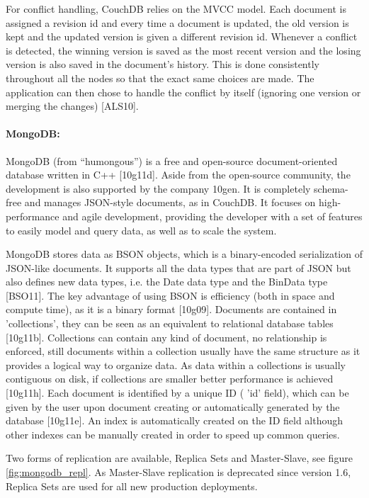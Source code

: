 \pagebreak
\pagebreak
For conflict handling, CouchDB relies on the MVCC model. Each document is assigned a revision id and every time a document is updated, the old version is kept and the updated version is given a different revision id. Whenever a conflict is detected, the winning version is saved as the most recent version and the losing version is also saved in the document’s history. This is done consistently throughout all the nodes so that the exact same choices are made. The application can then chose to handle the conflict by itself (ignoring one version or merging the changes) [ALS10].


\paragraph{MongoDB:\label{sec:back_mongo}}
MongoDB (from “humongous”) is a free and open-source document-oriented database written in C++ [10g11d]. Aside from the open-source community, the development is also supported by the company 10gen.
It is completely schema-free and manages JSON-style documents, as in CouchDB. It focuses on high-performance and agile development, providing the developer with a set of features to easily model and query data, as well as to scale the system.

MongoDB stores data as BSON objects, which is a binary-encoded serialization of JSON-like documents. It supports all the data types that are part of JSON but also defines new data types, i.e. the Date data type and the BinData type [BSO11]. The key advantage of using BSON is efficiency (both in space and compute time), as it is a binary format [10g09].
Documents are contained in 'collections', they can be seen as an equivalent to relational database tables [10g11b]. Collections can contain any kind of document, no relationship is enforced, still documents within a collection usually have the same structure as it provides a logical way to organize data.
As data within a collections is usually contiguous on disk, if collections are smaller better performance is achieved [10g11h]. Each document is identified by a unique ID ( 'id' field), which can be given by the user upon document creating or automatically generated by the database [10g11e]. An index is automatically created on the ID field although other indexes can be manually created in order to speed up common queries.

Two forms of replication are available, Replica Sets and Master-Slave, see figure \ref{fig:mongodb_repl}. As Master-Slave replication is deprecated since version 1.6, Replica Sets are used for all new production deployments.

